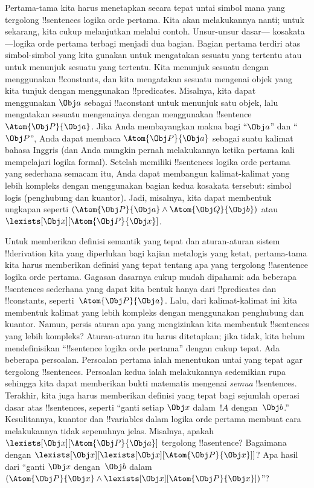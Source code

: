 \documentclass[../../../include/open-logic-section]{subfiles}
\begin{document}


Pertama-tama kita harus menetapkan secara tepat untai simbol mana yang
tergolong !!{sentence}s logika orde pertama. Kita akan melakukannya nanti;
untuk sekarang, kita cukup melanjutkan melalui contoh. Unsur-unsur dasar---
kosakata---logika orde pertama terbagi menjadi dua bagian. Bagian pertama
terdiri atas simbol-simbol yang kita gunakan untuk mengatakan sesuatu yang
tertentu atau untuk menunjuk sesuatu yang tertentu. Kita menunjuk sesuatu
dengan menggunakan !!{constant}s, dan kita mengatakan sesuatu mengenai objek
yang kita tunjuk dengan menggunakan !!{predicate}s. Misalnya, kita dapat
menggunakan $\Obj a$ sebagai !!a{constant} untuk menunjuk satu objek, lalu
mengatakan sesuatu mengenainya dengan menggunakan !!{sentence}~$\Atom{\Obj
P}{\Obj a}$. Jika Anda membayangkan makna bagi ``$\Obj a$'' dan ``$\Obj P$'',
Anda dapat membaca $\Atom{\Obj P}{\Obj a}$ sebagai suatu kalimat bahasa Inggris
(dan Anda mungkin pernah melakukannya ketika pertama kali mempelajari logika
formal). Setelah memiliki !!{sentence}s logika orde pertama yang sederhana
semacam itu, Anda dapat membangun kalimat-kalimat yang lebih kompleks dengan
menggunakan bagian kedua kosakata tersebut: simbol logis (penghubung dan
kuantor). Jadi, misalnya, kita dapat membentuk ungkapan seperti
$(\Atom{\Obj P}{\Obj a} \land \Atom{\Obj Q}{\Obj b})$ atau~$\lexists[\Obj x][\Atom{\Obj P}{\Obj x}]$.

Untuk memberikan definisi semantik yang tepat dan aturan-aturan sistem
!!{derivation} kita yang diperlukan bagi kajian metalogis yang ketat,
pertama-tama kita harus memberikan definisi yang tepat tentang apa yang
tergolong !!a{sentence} logika orde pertama. Gagasan dasarnya cukup mudah
dipahami: ada beberapa !!{sentence}s sederhana yang dapat kita bentuk hanya
dari !!{predicate}s dan !!{constant}s, seperti~$\Atom{\Obj P}{\Obj a}$. Lalu,
dari kalimat-kalimat ini kita membentuk kalimat yang lebih kompleks dengan
menggunakan penghubung dan kuantor. Namun, persis aturan apa yang mengizinkan
kita membentuk !!{sentence}s yang lebih kompleks? Aturan-aturan itu harus
ditetapkan; jika tidak, kita belum mendefinisikan ``!!{sentence} logika orde
pertama'' dengan cukup tepat. Ada beberapa persoalan. Persoalan pertama ialah
menentukan untai yang tepat agar tergolong !!{sentence}s. Persoalan kedua
ialah melakukannya sedemikian rupa sehingga kita dapat memberikan bukti
matematis mengenai \emph{semua} !!{sentence}s. Terakhir, kita juga harus
memberikan definisi yang tepat bagi sejumlah operasi dasar atas !!{sentence}s,
seperti ``ganti setiap $\Obj x$ dalam~$!A$ dengan~$\Obj b$.'' Kesulitannya,
kuantor dan !!{variable}s dalam logika orde pertama membuat cara melakukannya
tidak sepenuhnya jelas. Misalnya, apakah $\lexists[\Obj x][\Atom{\Obj P}{\Obj
a}]$ tergolong !!a{sentence}? Bagaimana dengan $\lexists[\Obj x][\lexists[\Obj
x][\Atom{\Obj P}{\Obj x}]]$? Apa hasil dari ``ganti $\Obj x$ dengan~$\Obj b$
dalam $(\Atom{\Obj P}{\Obj x} \land \lexists[\Obj x][\Atom{\Obj P}{\Obj
x}])$''?
\end{document}
